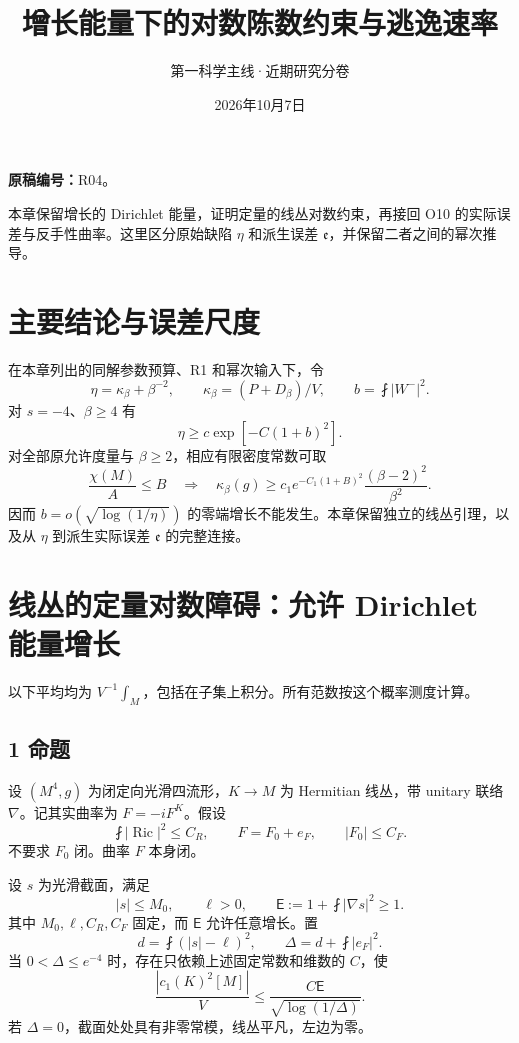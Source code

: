 \documentclass[UTF8,11pt,fontset=none]{ctexart}
\title{增长能量下的对数陈数约束与逃逸速率}
\author{第一科学主线·近期研究分卷}
\date{2026年10月7日}
\begin{document}
\maketitle
\noindent\textbf{原稿编号：}R04。

本章保留增长的 Dirichlet 能量，证明定量的线丛对数约束，再接回 O10 的实际误差与反手性曲率。这里区分原始缺陷 \(\eta\) 和派生误差 \(\mathfrak e\)，并保留二者之间的幂次推导。\cite{R04,Strong,FD}

\section{主要结论与误差尺度}\label{ch4:ux4e3bux8981ux7ed3ux8bbaux4e0eux8befux5deeux5c3aux5ea6}

在本章列出的同解参数预算、R1 和幂次输入下，令 \[
\eta=\kappa_\beta+\beta^{-2},\qquad
\kappa_\beta=(P+D_\beta)/V,\qquad b=\fint|W^-|^2.
\] 对 \(s=-4\)、\(\beta\ge4\) 有 \[
\eta\ge c\exp[-C(1+b)^2].\tag{4.1}\label{eq:r4:1}
\] 对全部原允许度量与 \(\beta\ge2\)，相应有限密度常数可取 \[
\frac{\chi(M)}A\le B\quad\Longrightarrow\quad
\kappa_\beta(g)\ge c_1e^{-C_1(1+B)^2}
\frac{(\beta-2)^2}{\beta^2}.\tag{4.2}\label{eq:r4:2}
\] 因而 \(b=o(\sqrt{\log(1/\eta)})\) 的零端增长不能发生。本章保留独立的线丛引理，以及从 \(\eta\) 到派生实际误差 \(\mathfrak e\) 的完整连接。

\section{线丛的定量对数障碍：允许 Dirichlet 能量增长}\label{ch4:ux7ebfux4e1bux7684ux5b9aux91cfux5bf9ux6570ux969cux788dux5141ux8bb8-dirichlet-ux80fdux91cfux589eux957f}

以下平均均为 \(V^{-1}\int_M\)，包括在子集上积分。所有范数按这个概率测度计算。

\subsection{1 命题}\label{ch4:ux547dux9898}

设 \((M^4,g)\) 为闭定向光滑四流形，\(K\to M\) 为 Hermitian 线丛，带 unitary 联络 \(\nabla\)。记其实曲率为 \(F=-iF^K\)。假设 \[
\fint|\operatorname{Ric}|^2\le C_R,
\qquad F=F_0+e_F,
\qquad |F_0|\le C_F.
\tag{4.3}\label{eq:r4:3}
\] 不要求 \(F_0\) 闭。曲率 \(F\) 本身闭。

设 \(s\) 为光滑截面，满足 \[
|s|\le M_0,\qquad \ell>0,
\qquad \mathsf E:=1+\fint|\nabla s|^2\ge1.
\] 其中 \(M_0,\ell,C_R,C_F\) 固定，而 \(\mathsf E\) 允许任意增长。置 \[
d=\fint(|s|-\ell)^2,
\qquad \Delta=d+\fint|e_F|^2.
\tag{4.4}\label{eq:r4:4}
\] 当 \(0<\Delta\le e^{-4}\) 时，存在只依赖上述固定常数和维数的 \(C\)，使 \[
\boxed{
\frac{|c_1(K)^2[M]|}{V}
\le \frac{C\mathsf E}{\sqrt{\log(1/\Delta)}}.
}
\tag{4.5}\label{eq:r4:5}
\] 若 \(\Delta=0\)，截面处处具有非零常模，线丛平凡，左边为零。
\end{document}
